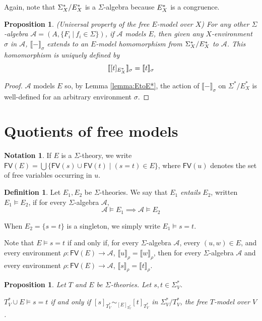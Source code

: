 \documentclass{msthesis}
\newtheorem{prop}[theorem]{Proposition}
\theoremstyle{definition}
\newtheorem{definition}[theorem]{Definition}
\newtheorem*{notation}{Notation}
\newcommand{\semof}[1]{\llbracket{#1}\rrbracket}
\newcommand{\fv}[1]{\mathsf{FV}(#1)}
\newcommand{\Amod}{\mathscr{A}}
\begin{document}
Again, note that $\Sigma^*_X/E^*_{X}$ is a $\Sigma$-algebra because $E^*_{X}$ is a congruence.

\begin{prop}
    \label{prop:free-mod}
    (Universal property of the free $E$-model over $X$) For any other $\Sigma$-algebra $\Amod=(A, \{F_i\ |\ f_i \in \Sigma\})$, if $\Amod$ models $E$, then given any $X$-environment $\sigma$ in $\Amod$, $\semof{-}_\sigma$ extends to an $E$-model homomorphism from $\Sigma^*_X/E^*_{X}$ to $\Amod$.  This homomorphism is uniquely defined by
    \begin{equation}\label{eq:free_e_model_hom}
    \semof{[t]_{\thof{X}}}_{\sigma} = \semof{t}_\sigma
    \end{equation}
\end{prop}

\begin{proof}
    $\Amod$ models $E$ so, by Lemma \ref{lemma:EtoE*}, the action of $\semof{-}_\sigma$ on $\Sigma^*/E^*_X$ is well-defined for an arbitrary environment $\sigma$.
\end{proof}

\section{Quotients of free models}

\begin{notation}
    If $E$ is a $\Sigma$-theory, we write $\fv{E} = \bigcup \{\fv{s} \cup \fv{t} \mid (s=t) \in E\}$, where $\fv{u}$ denotes the set of free variables occurring in $u$.
\end{notation}

\begin{definition}\label{def:entails}
Let $E_1, E_2$ be $\Sigma$-theories.
We say that $E_1$ \emph{entails} $E_2$, written $E_1 \models E_2$, if for every $\Sigma$-algebra  $\Amod$, 
\[ \Amod \models E_1 \implies \Amod \models E_2 \]
\end{definition}

When $E_2 = \{s = t\}$ is a singleton, we simply write $E_1 \models s = t$.

Note that $E \models s = t$ if and only if, for every $\Sigma$-algebra $\Amod$, every $(u, w) \in E$, and every environment $\rho : \fv{E} \to \Amod$, $\semof{u}_\rho = \semof{w}_\rho$, then for every $\Sigma$-algebra $\Amod$ and every environment $\rho : \fv{E} \to \Amod$, $\semof{s}_\rho = \semof{t}_\rho.$

\begin{prop}\label{prop:union_models}
Let $T$ and $E$ be $\Sigma$-theories.  Let $s,t \in \Sigma^*_V$. 

$T^*_V \cup E \models s = t$ if and only if $[s]_{T^*_V} \sim_{[E]_{T^*_V}} [t]_{T^*_V}$ in
 $\Sigma^*_V/T^*_V$, the free $T$-model over $V$.
    \end{prop}
\end{document}
